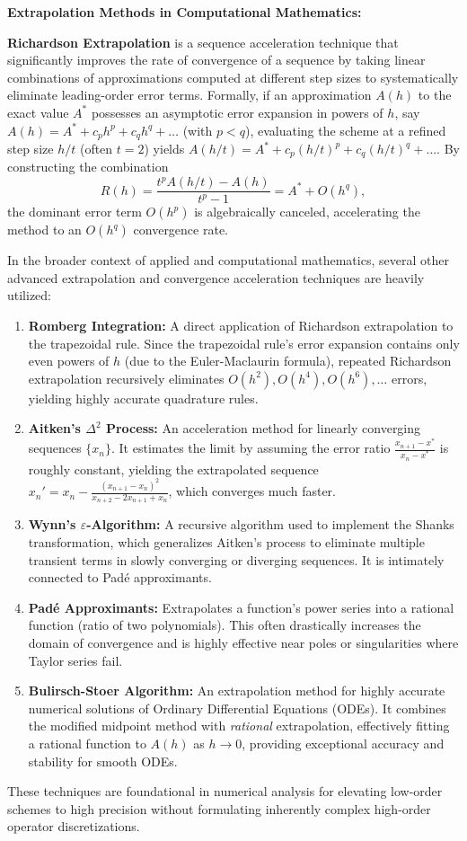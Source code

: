 \begin{remark}
\textbf{Extrapolation Methods in Computational Mathematics:}

\textbf{Richardson Extrapolation} is a sequence acceleration technique that significantly improves the rate of convergence of a sequence by taking linear combinations of approximations computed at different step sizes to systematically eliminate leading-order error terms. Formally, if an approximation $A(h)$ to the exact value $A^*$ possesses an asymptotic error expansion in powers of $h$, say $A(h) = A^* + c_p h^p + c_q h^q + \dots$ (with $p < q$), evaluating the scheme at a refined step size $h/t$ (often $t=2$) yields $A(h/t) = A^* + c_p (h/t)^p + c_q (h/t)^q + \dots$. By constructing the combination
\[ R(h) = \frac{t^p A(h/t) - A(h)}{t^p - 1} = A^* + O(h^q), \]
the dominant error term $O(h^p)$ is algebraically canceled, accelerating the method to an $O(h^q)$ convergence rate.

In the broader context of applied and computational mathematics, several other advanced extrapolation and convergence acceleration techniques are heavily utilized:
\begin{enumerate}
    \item \textbf{Romberg Integration:} A direct application of Richardson extrapolation to the trapezoidal rule. Since the trapezoidal rule's error expansion contains only even powers of $h$ (due to the Euler-Maclaurin formula), repeated Richardson extrapolation recursively eliminates $O(h^2), O(h^4), O(h^6), \dots$ errors, yielding highly accurate quadrature rules.
    \item \textbf{Aitken's $\Delta^2$ Process:} An acceleration method for linearly converging sequences $\{x_n\}$. It estimates the limit by assuming the error ratio $\frac{x_{n+1} - x^*}{x_n - x^*}$ is roughly constant, yielding the extrapolated sequence $x_n' = x_n - \frac{(x_{n+1}-x_n)^2}{x_{n+2}-2x_{n+1}+x_n}$, which converges much faster.
    \item \textbf{Wynn's $\varepsilon$-Algorithm:} A recursive algorithm used to implement the Shanks transformation, which generalizes Aitken's process to eliminate multiple transient terms in slowly converging or diverging sequences. It is intimately connected to Padé approximants.
    \item \textbf{Padé Approximants:} Extrapolates a function's power series into a rational function (ratio of two polynomials). This often drastically increases the domain of convergence and is highly effective near poles or singularities where Taylor series fail.
    \item \textbf{Bulirsch-Stoer Algorithm:} An extrapolation method for highly accurate numerical solutions of Ordinary Differential Equations (ODEs). It combines the modified midpoint method with \textit{rational} extrapolation, effectively fitting a rational function to $A(h)$ as $h \to 0$, providing exceptional accuracy and stability for smooth ODEs.
\end{enumerate}
These techniques are foundational in numerical analysis for elevating low-order schemes to high precision without formulating inherently complex high-order operator discretizations.
\end{remark}

